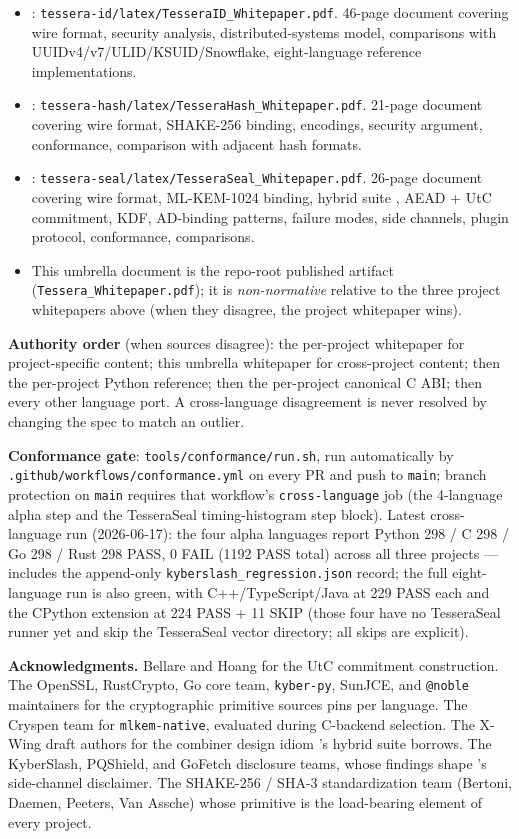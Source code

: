 \begin{itemize}
\item \tesseraid{}: \texttt{tessera-id/latex/TesseraID\_Whitepaper.pdf}. 46-page document covering wire format, security analysis, distributed-systems model, comparisons with UUIDv4/v7/ULID/KSUID/Snowflake, eight-language reference implementations.
\item \tesserahash{}: \texttt{tessera-hash/latex/TesseraHash\_Whitepaper.pdf}. 21-page document covering wire format, SHAKE-256 binding, encodings, security argument, conformance, comparison with adjacent hash formats.
\item \tesseraseal{}: \texttt{tessera-seal/latex/TesseraSeal\_Whitepaper.pdf}. 26-page document covering wire format, ML-KEM-1024 binding, hybrid suite , AEAD + UtC commitment, KDF, AD-binding patterns, failure modes, side channels, plugin protocol, conformance, comparisons.

\item This umbrella document is the repo-root published artifact (\texttt{Tessera\_Whitepaper.pdf}); it is \emph{non-normative} relative to the three project whitepapers above (when they disagree, the project whitepaper wins).
\end{itemize}

\textbf{Authority order} (when sources disagree): the per-project whitepaper for project-specific content; this umbrella whitepaper for cross-project content; then the per-project Python reference; then the per-project canonical C ABI; then every other language port. A cross-language disagreement is never resolved by changing the spec to match an outlier.

\textbf{Conformance gate}: \texttt{tools/conformance/run.sh}, run automatically by \texttt{.github/workflows/conformance.yml} on every PR and push to \texttt{main}; branch protection on \texttt{main} requires that workflow's \texttt{cross-language} job (the 4-language alpha step and the TesseraSeal timing-histogram step block). Latest cross-language run (2026-06-17): the four alpha languages report Python 298 / C 298 / Go 298 / Rust 298 PASS, 0 FAIL (1192 PASS total) across all three projects --- includes the append-only \texttt{kyberslash\_regression.json} record; the full eight-language run is also green, with C++/TypeScript/Java at 229 PASS each and the CPython extension at 224 PASS + 11 SKIP (those four have no TesseraSeal runner yet and skip the TesseraSeal vector directory; all skips are explicit).

\textbf{Acknowledgments.} Bellare and Hoang for the UtC commitment construction. The OpenSSL, RustCrypto, Go core team, \texttt{kyber-py}, SunJCE, and \texttt{@noble} maintainers for the cryptographic primitive sources \tesseraseal{} pins per language. The Cryspen team for \texttt{mlkem-native}, evaluated during C-backend selection. The X-Wing draft authors \citep{xwing-draft} for the combiner design idiom \tesseraseal{}'s hybrid suite borrows. The KyberSlash, PQShield, and GoFetch disclosure teams, whose findings shape \tesseraseal{}'s side-channel disclaimer. The SHAKE-256 / SHA-3 standardization team (Bertoni, Daemen, Peeters, Van Assche) whose primitive is the load-bearing element of every \tessera{} project.
